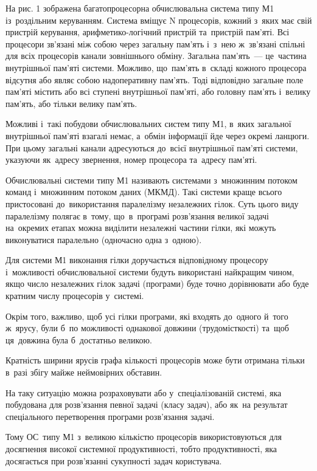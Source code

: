 \documentclass[
	a4paper,
	oneside,
	BCOR = 10mm,
	DIV = 12,
	12pt,
	headings = normal,
]{scrartcl}
\begin{document}
		На рис. 1 зображена багатопроцесорна обчислювальна система типу М1 із~роздільним керуванням. Система вміщує N процесорів, кожний з~яких має свій пристрій керування, арифметико-логічний пристрій та~пристрій пам’яті. Всі процесори зв’язані між собою через загальну пам’ять і~з~нею ж~зв’язані спільні для всіх процесорів канали зовнішнього обміну. Загальна пам’ять~— це~частина внутрішньої пам’яті системи. Можливо, що~пам’ять в~складі кожного процесора відсутня або являє собою надоперативну пам’ять. Тоді відповідно загальне поле пам’яті містить або всі ступені внутрішньої пам’яті, або головну пам’ять і~велику пам’ять, або тільки велику пам’ять.

		Можливі і~такі побудови обчислювальних систем типу М1, в~яких загальної внутрішньої пам’яті взагалі немає, а~обмін інформації йде через окремі ланцюги. При цьому загальні канали адресуються до~всієї внутрішньої пам’яті системи, указуючи як~адресу звернення, номер процесора та~адресу пам’яті.

		Обчислювальні системи типу М1 називають системами з~множинним потоком команд і~множинним потоком даних (МКМД). Такі системи краще всього пристосовані до~використання паралелізму незалежних гілок. Суть цього виду паралелізму полягає в~тому, що~в~програмі розв’язання великої задачі на~окремих етапах можна виділити незалежні частини гілки, які можуть виконуватися паралельно (одночасно одна з~одною).

		Для системи М1 виконання гілки доручається відповідному процесору і~можливості обчислювальної системи будуть використані найкращим чином, якщо число незалежних гілок задачі (програми) буде точно дорівнювати або буде кратним числу процесорів у~системі.

		Окрім того, важливо, щоб усі гілки програми, які входять до~одного й~того ж~ярусу, були б~по можливості однакової довжини (трудомісткості) та~щоб ця~довжина була б~достатньо великою.

		Кратність ширини ярусів графа кількості процесорів може бути отримана тільки в~разі збігу майже неймовірних обставин.

		На таку ситуацію можна розраховувати або у~спеціалізованій системі, яка побудована для розв’язання певної задачі (класу задач), або як~на результат спеціального перетворення програми розв’язання задачі.

		Тому ОС~типу М1 з~великою кількістю процесорів використовуються для досягнення високої системної продуктивності, тобто продуктивності, яка досягається при розв’язанні сукупності задач користувача.
\end{document}
